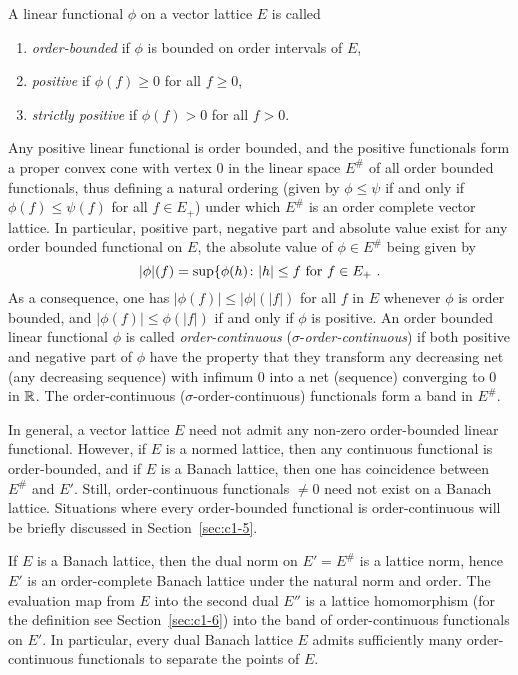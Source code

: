 A linear functional $ \phi $ on a vector lattice $ E $ is called
\begin{enumerate}[label=]

\item
\emph{order-bounded} if $ \phi $ is bounded on order intervals of $ E $,

\item
\emph{positive} if $ \phi(f) \geq 0 $ for all  $ f \geq 0 $, 

\item
\emph{strictly positive} if $ \phi(f) > 0 $ for all  $ f > 0 $.

\end{enumerate}
Any positive linear functional is order bounded, and the positive functionals form a proper convex cone with vertex $ 0 $ in the linear space $ E^{\#} $ of all order bounded functionals, thus defining a natural
ordering (given by $ \phi \leq \psi $ if and only if $ \phi(f) \leq \psi(f) $ for all $ f \in E_{+} $) under which $ E^{\#} $ is an order complete vector lattice.
In particular, positive part, negative part and absolute value exist for any order bounded functional on $ E $, the absolute value of $ \phi \in E^{\#} $ being given by
\[
	|\phi|(f) = \sup\{\phi(h) \colon |h| \leq f \text{ for $ f \in E_{+} $ .}
\]
As a consequence, one has $ |\phi(f)| \leq |\phi|(|f|) $ for all $ f $ in $ E $ whenever $ \phi $ is order bounded, and $ |\phi(f)| \leq \phi(|f|) $ if and only if $ \phi $ is positive.
An order bounded linear functional $ \phi $ is called \emph{order-continuous} ($ \sigma $-\emph{order-continuous}) if both positive and negative part of $ \phi $ have the property that they transform any decreasing net (any decreasing sequence) with infimum $ 0 $ into a net (sequence) converging to $ 0 $ in $ \mathbb{R} $.
The order-continuous ($ \sigma $-order-continuous) functionals form a band in $ E^{\#} $.

In general, a vector lattice $ E $ need not admit any non-zero order-bounded linear functional.
However, if $ E $ is a normed lattice, then any continuous functional is order-bounded, and if $ E $ is a Banach lattice, then one has coincidence between $ E^{\#} $ and $ E' $.
Still, order-continuous functionals $ \neq 0 $ need not exist on a Banach lattice.
Situations where every order-bounded functional is order-continuous will be briefly discussed in Section~\ref{sec:c1-5}.

If $ E $ is a Banach lattice, then the dual norm on $ E' = E^{\#} $ is a lattice norm, hence $ E' $ is an order-complete Banach lattice under the natural norm and order.
The evaluation map from $ E $ into the second dual $ E'' $ is a lattice homomorphism (for the definition see Section~\ref{sec:c1-6}) into the band of order-continuous functionals on $ E' $.
In particular, every dual Banach lattice $ E $ admits sufficiently many order-continuous functionals to separate the points of $ E $.
